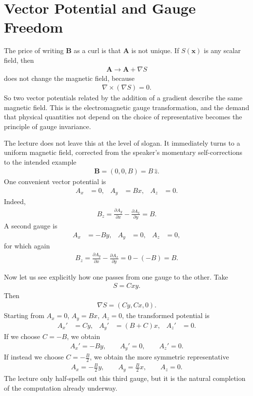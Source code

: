 \section{Vector Potential and Gauge Freedom}

The price of writing \(\mathbf B\) as a curl is that \(\mathbf A\) is not unique. If \(S(\mathbf x)\) is any scalar field, then
\begin{align}
\mathbf A \longrightarrow \mathbf A + \nabla S
\end{align}
does not change the magnetic field, because
\begin{align}
\nabla\times (\nabla S)=0.
\end{align}
So two vector potentials related by the addition of a gradient describe the same magnetic field. This is the electromagnetic gauge transformation, and the demand that physical quantities not depend on the choice of representative becomes the principle of gauge invariance.

The lecture does not leave this at the level of slogan. It immediately turns to a uniform magnetic field, corrected from the speaker's momentary self-corrections to the intended example
\begin{align}
\mathbf B = (0,0,B)=B\,\hat z.
\end{align}
One convenient vector potential is
\begin{align}
A_x &= 0, & A_y &= Bx, & A_z &= 0.
\end{align}
Indeed,
\begin{align}
B_z=\frac{\partial A_y}{\partial x}-\frac{\partial A_x}{\partial y}=B.
\end{align}
A second gauge is
\begin{align}
A_x &= -By, & A_y &= 0, & A_z &= 0,
\end{align}
for which again
\begin{align}
B_z=\frac{\partial A_y}{\partial x}-\frac{\partial A_x}{\partial y}=0-(-B)=B.
\end{align}

Now let us see explicitly how one passes from one gauge to the other. Take
\begin{align}
S=Cxy.
\end{align}
Then
\begin{align}
\nabla S = (Cy,Cx,0).
\end{align}
Starting from \(A_x=0\), \(A_y=Bx\), \(A_z=0\), the transformed potential is
\begin{align}
A_x' &= Cy, &
A_y' &= (B+C)x, &
A_z' &= 0.
\end{align}
If we choose \(C=-B\), we obtain
\begin{align}
A_x'=-By,\qquad A_y'=0,\qquad A_z'=0.
\end{align}
If instead we choose \(C=-\frac{B}{2}\), we obtain the more symmetric representative
\begin{align}
A_x=-\frac{B}{2}y,\qquad A_y=\frac{B}{2}x,\qquad A_z=0.
\end{align}
The lecture only half-spells out this third gauge, but it is the natural completion of the computation already underway.


